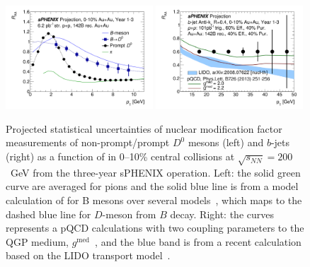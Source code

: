 \begin{figure}[htbp]
\centering
\includegraphics[width=0.49\textwidth]{figs_macro_HF/D0_BUP2020_AuAu_RAA_3yr.pdf}
\includegraphics[width=0.49\textwidth]{figs/200pp_pythia8_CTEQ6L_7GeV_ALL_cfg_eneg_DSTReader_root_Draw_HFJetTruth_CrossSection2RAA_Theory_3yr_deta0_70.pdf}
\caption{Projected
  statistical uncertainties of nuclear modification factor \raa
  measurements of non-prompt/prompt $D^0$ mesons (left) and $b$-jets
  (right) as a function of \pT in 0--10\% central \auau collisions at
  $\sqrt{s_{NN}}=200$~GeV from the three-year sPHENIX operation. Left:
  the solid green curve are averaged \raa for pions and the
  solid blue line is from a model calculation of \raa for B mesons over several models~\cite{Duke,TAMU,PHSD,CUJET}, which maps to the dashed blue line for $D$-meson from $B$ decay. 
  Right: the curves
  represents a pQCD calculations with two coupling parameters to the
  QGP medium, $g^{\textrm{med}}$~\cite{Huang:2013vaa}, and the blue
  band is from a recent calculation based on the LIDO transport
  model~\cite{Ke:2020nsm}. }
\label{fig:HF-inclusive-RAA}
\end{figure}

